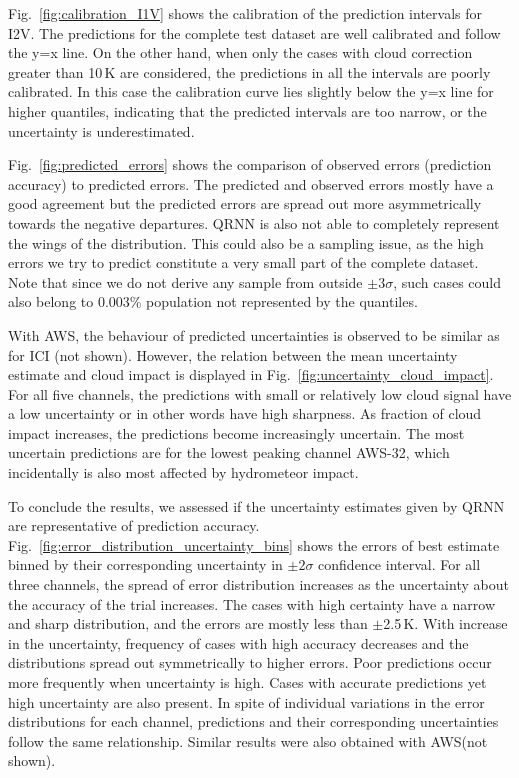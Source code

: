 \documentclass[amt, manuscript]{copernicus}
\begin{document}
Fig.~\ref{fig:calibration_I1V} shows the calibration of the prediction intervals for I2V. The predictions for the complete test dataset are well calibrated and follow the y=x line. On the other hand, when only the cases with  cloud correction greater than 10\,K are considered, the predictions in all the intervals are poorly calibrated. In this case the calibration curve lies slightly below the y=x line for higher quantiles, indicating that the predicted intervals are too narrow, or the uncertainty is underestimated. 

Fig.~\ref{fig:predicted_errors} shows the comparison of observed errors (prediction accuracy) to predicted errors. The predicted and observed errors mostly have a good agreement but the predicted errors are spread out more asymmetrically towards the negative departures. QRNN is also not able to completely represent the wings of the distribution. This could also be a sampling issue, as the high errors we try to predict constitute a very small part of the complete dataset. Note that since we do not derive any sample from outside $\pm3\sigma$, such cases could also belong to 0.003\% population not represented by the quantiles.   

With AWS, the behaviour of predicted uncertainties is observed to be similar as for ICI (not shown). However, the relation between the mean uncertainty estimate and cloud impact is displayed in Fig.~\ref{fig:uncertainty_cloud_impact}. For all five channels, the predictions with small or relatively low cloud signal have a low uncertainty or in other words have high sharpness. As fraction of cloud impact increases, the predictions become increasingly uncertain. The most uncertain predictions are for the lowest peaking channel AWS-32, which incidentally is also most affected by  hydrometeor impact.  

To conclude the results, we assessed if the uncertainty estimates given by QRNN are representative of prediction accuracy. Fig.~\ref{fig:error_distribution_uncertainty_bins} shows the errors of best estimate binned by their corresponding uncertainty in $\pm2\sigma$  confidence interval. For all three channels, the spread of error distribution increases as the uncertainty about the accuracy of the trial increases. The cases with high certainty have a narrow and sharp distribution, and the errors are mostly less than $\pm$2.5\,K. With increase in the uncertainty, frequency of cases with high accuracy decreases and the distributions spread out symmetrically to higher errors. Poor predictions occur more frequently when uncertainty is high. Cases with accurate predictions yet high uncertainty are also present. In spite of individual variations in the error distributions for each channel, predictions and their corresponding uncertainties follow the same relationship. Similar results were also obtained with AWS(not shown). 
\end{document}
